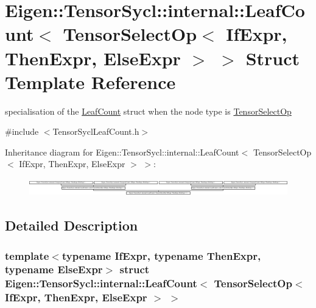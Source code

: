 \hypertarget{struct_eigen_1_1_tensor_sycl_1_1internal_1_1_leaf_count_3_01_tensor_select_op_3_01_if_expr_00_01c52e236a6cdd09f766f43b5467e5b3f7}{}\section{Eigen\+:\+:Tensor\+Sycl\+:\+:internal\+:\+:Leaf\+Count$<$ Tensor\+Select\+Op$<$ If\+Expr, Then\+Expr, Else\+Expr $>$ $>$ Struct Template Reference}
\label{struct_eigen_1_1_tensor_sycl_1_1internal_1_1_leaf_count_3_01_tensor_select_op_3_01_if_expr_00_01c52e236a6cdd09f766f43b5467e5b3f7}


specialisation of the \hyperlink{struct_eigen_1_1_tensor_sycl_1_1internal_1_1_leaf_count}{Leaf\+Count} struct when the node type is \hyperlink{class_eigen_1_1_tensor_select_op}{Tensor\+Select\+Op}  




{\ttfamily \#include $<$Tensor\+Sycl\+Leaf\+Count.\+h$>$}

Inheritance diagram for Eigen\+:\+:Tensor\+Sycl\+:\+:internal\+:\+:Leaf\+Count$<$ Tensor\+Select\+Op$<$ If\+Expr, Then\+Expr, Else\+Expr $>$ $>$\+:\begin{figure}[H]
\begin{center}
\leavevmode
\includegraphics[height=0.746004cm]{struct_eigen_1_1_tensor_sycl_1_1internal_1_1_leaf_count_3_01_tensor_select_op_3_01_if_expr_00_01c52e236a6cdd09f766f43b5467e5b3f7}
\end{center}
\end{figure}


\subsection{Detailed Description}
\subsubsection*{template$<$typename If\+Expr, typename Then\+Expr, typename Else\+Expr$>$\newline
struct Eigen\+::\+Tensor\+Sycl\+::internal\+::\+Leaf\+Count$<$ Tensor\+Select\+Op$<$ If\+Expr, Then\+Expr, Else\+Expr $>$ $>$}

